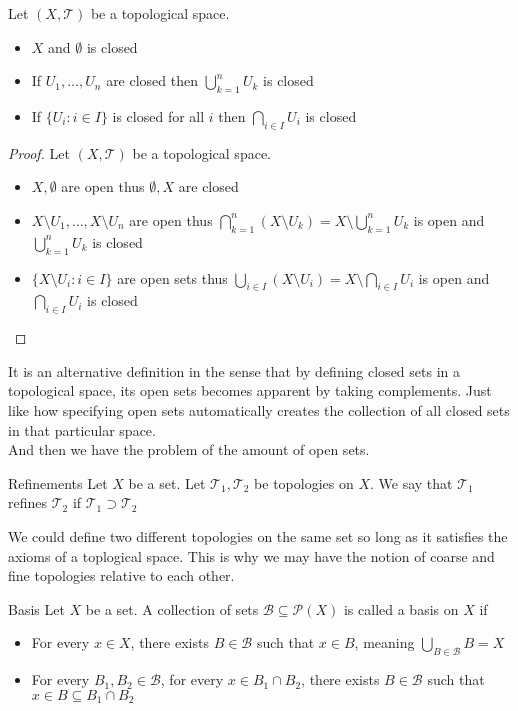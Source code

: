 \begin{prp}{}{} Let $(X,\mathcal{T})$ be a topological space. 
\begin{itemize}
\item $X$ and $\emptyset$ is closed
\item If $U_1,\dots,U_n$ are closed then $\bigcup_{k=1}^nU_k$ is closed
\item If $\{U_i:i\in I\}$ is closed for all $i$ then $\bigcap_{i\in I}U_i$ is closed
\end{itemize}\tcbline
\begin{proof}
Let $(X,\mathcal{T})$ be a topological space. 
\begin{itemize}
\item $X,\emptyset$ are open thus $\emptyset,X$ are closed
\item $X\setminus U_1,\dots,X\setminus U_n$ are open thus $\bigcap_{k=1}^n(X\setminus U_k)=X\setminus\bigcup_{k=1}^nU_k$ is open and $\bigcup_{k=1}^nU_k$ is closed
\item $\{X\setminus U_i:i\in I\}$ are open sets thus $\bigcup_{i\in I}(X\setminus U_i)=X\setminus\bigcap_{i\in I}U_i$ is open and $\bigcap_{i\in I}U_i$ is closed
\end{itemize}
\end{proof}
\end{prp}

It is an alternative definition in the sense that by defining closed sets in a topological space, its open sets becomes apparent by taking complements. Just like how specifying open sets automatically creates the collection of all closed sets in that particular space. \\
And then we have the problem of the amount of open sets. 

\begin{defn}{Refinements}{} Let $X$ be a set. Let $\mathcal{T}_1,\mathcal{T}_2$ be topologies on $X$. We say that $\mathcal{T}_1$ refines $\mathcal{T}_2$ if $\mathcal{T}_1\supset\mathcal{T}_2$
\end{defn}

We could define two different topologies on the same set so long as it satisfies the axioms of a toplogical space. This is why we may have the notion of coarse and fine topologies relative to each other. 

\begin{defn}{Basis}{} Let $X$ be a set. A collection of sets $\mathcal{B}\subseteq\mathcal{P}(X)$ is called a basis on $X$ if
\begin{itemize}
\item For every $x\in X$, there exists $B\in\mathcal{B}$ such that $x\in B$, meaning $\bigcup_{B\in\mathcal{B}}B=X$
\item For every $B_1,B_2\in\mathcal{B}$, for every $x\in B_1\cap B_2$, there exists $B\in\mathcal{B}$ such that $x\in B\subseteq B_1\cap B_2$
\end{itemize}
\end{defn}

